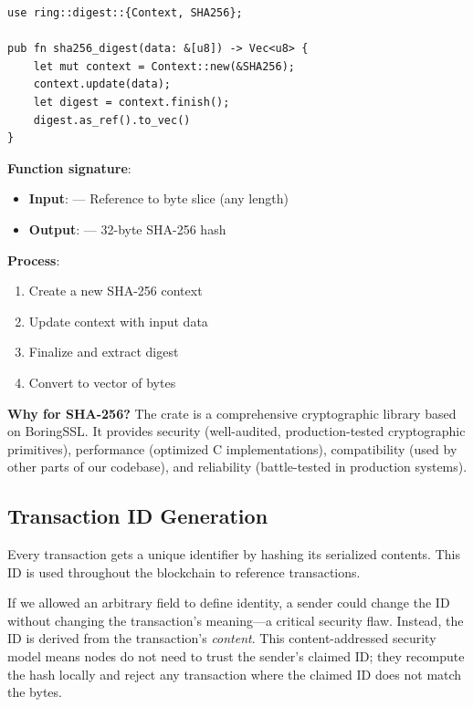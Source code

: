 \begin{listing}[htbp]
\caption{SHA-256 hashing implementation ()}
\label{lst:ch08-sha256-digest}
\begin{verbatim}
use ring::digest::{Context, SHA256};

pub fn sha256_digest(data: &[u8]) -> Vec<u8> {
    let mut context = Context::new(&SHA256);
    context.update(data);
    let digest = context.finish();
    digest.as_ref().to_vec()
}
\end{verbatim}
\end{listing}

\textbf{Function signature}:
\begin{itemize}
  \item \textbf{Input}: \code{\&[u8]} --- Reference to byte slice (any length)
  \item \textbf{Output}:  --- 32-byte SHA-256 hash
\end{itemize}

\textbf{Process}:
\begin{enumerate}
  \item Create a new SHA-256 context
  \item Update context with input data
  \item Finalize and extract digest
  \item Convert to vector of bytes
\end{enumerate}

\textbf{Why  for SHA-256?} The  crate is a comprehensive cryptographic library based on BoringSSL. It provides security (well-audited, production-tested cryptographic primitives), performance (optimized C implementations), compatibility (used by other parts of our codebase), and reliability (battle-tested in production systems).

\subsection{Transaction ID Generation}
\label{sec:ch08-txid-generation}

Every transaction gets a unique identifier by hashing its serialized contents. This ID is used throughout the blockchain to reference transactions.

\begin{infobox}
If we allowed an arbitrary  field to define identity, a sender could change the ID without changing the transaction's meaning---a critical security flaw. Instead, the ID is derived from the transaction's \emph{content}. This content-addressed security model means nodes do not need to trust the sender's claimed ID; they recompute the hash locally and reject any transaction where the claimed ID does not match the bytes.
\end{infobox}

